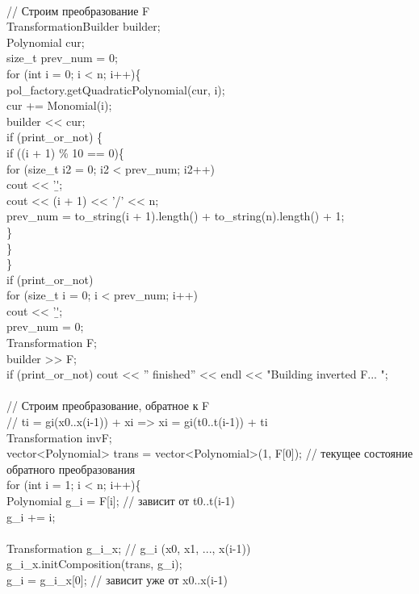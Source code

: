 	\\
	// Строим преобразование F\\
	TransformationBuilder builder;\\
	Polynomial cur;\\
	size\_t prev\_num = 0;\\
	for (int i = 0; i < n; i++)\{\\
		pol\_factory.getQuadraticPolynomial(cur, i);\\
		cur += Monomial(i);\\
		builder << cur;\\
		if (print\_or\_not) \{\\
			if ((i + 1) \% 10 == 0)\{\\
				for (size\_t i2 = 0; i2 < prev\_num; i2++)\\ cout << '\b';\\
				cout << (i + 1) << '/' << n;\\
				prev\_num = to\_string(i + 1).length() + to\_string(n).length() + 1;\\
			\}\\
		\}\\
	\}\\
	if (print\_or\_not)\\
	for (size\_t i = 0; i < prev\_num; i++)\\
	cout << '\b';\\
	prev\_num = 0;\\
	Transformation F;\\
	builder >> F;\\
	if (print\_or\_not) cout << '' finished'' << endl << "Building inverted F... ";\\
	\\
	// Строим преобразование, обратное к F\\
	// ti = gi(x0..x(i-1)) + xi => xi = gi(t0..t(i-1)) + ti\\
	Transformation invF;\\
	vector<Polynomial> trans = vector<Polynomial>(1, F[0]); // текущее состояние обратного преобразования\\
	for (int i = 1; i < n; i++)\{\\
		Polynomial g\_i = F[i]; // зависит от t0..t(i-1)\\
		g\_i += {i};\\
		\\
		Transformation g\_i\_x; // g\_i (x0, x1, ..., x(i-1))\\
		g\_i\_x.initComposition(trans, g\_i);\\
		g\_i = g\_i\_x[0]; // зависит уже от x0..x(i-1)\\
